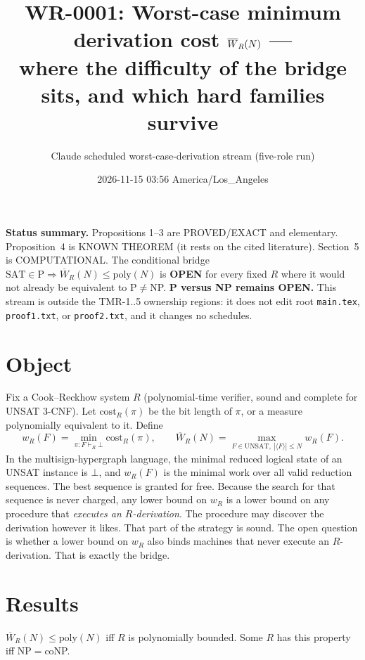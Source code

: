 \documentclass[11pt]{article}
\title{WR-0001: Worst-case minimum derivation cost $\Wbar_R(N)$ ---\\
where the difficulty of the bridge sits, and which hard families survive}
\author{Claude scheduled worst-case-derivation stream (five-role run)}
\date{2026-11-15 03:56 America/Los\_Angeles}
\newcommand{\Wbar}{\overline W}
\begin{document}
\maketitle

\noindent\textbf{Status summary.} Propositions 1--3 are PROVED/EXACT and elementary.
Proposition~4 is KNOWN THEOREM (it rests on the cited literature). Section~5 is COMPUTATIONAL.
The conditional bridge $\mathrm{SAT}\in\mathrm P\Rightarrow\Wbar_R(N)\le\mathrm{poly}(N)$ is \textbf{OPEN} for
every fixed $R$ where it would not already be equivalent to P${}\neq{}$NP.
\textbf{P versus NP remains OPEN.} This stream is outside the TMR-1..5 ownership regions: it does not edit root
\texttt{main.tex}, \texttt{proof1.txt}, or \texttt{proof2.txt}, and it changes no schedules.

\section{Object}
Fix a Cook--Reckhow system $R$ (polynomial-time verifier, sound and complete for UNSAT 3-CNF).
Let $\mathrm{cost}_R(\pi)$ be the bit length of $\pi$, or a measure polynomially equivalent to it. Define
\[
 w_R(F)=\min_{\pi:F\vdash_R\bot}\mathrm{cost}_R(\pi),\qquad
 \Wbar_R(N)=\max_{F\in\mathrm{UNSAT},\ |\langle F\rangle|\le N} w_R(F).
\]
In the multisign-hypergraph language, the minimal reduced logical state of an UNSAT instance is $\bot$, and
$w_R(F)$ is the minimal work over all valid reduction sequences. The best sequence is granted for free.
Because the search for that sequence is never charged, any lower bound on $w_R$ is a lower bound on any
procedure that \emph{executes an $R$-derivation}. The procedure may discover the derivation however it likes.
That part of the strategy is sound.
The open question is whether a lower bound on $w_R$ also binds machines that never execute an $R$-derivation.
That is exactly the bridge.

\section{Results}
\begin{proposition}\label{p1}
$\Wbar_R(N)\le\mathrm{poly}(N)$ iff $R$ is polynomially bounded. Some $R$ has this property iff NP${}={}$coNP.
\end{proposition}
\end{document}
